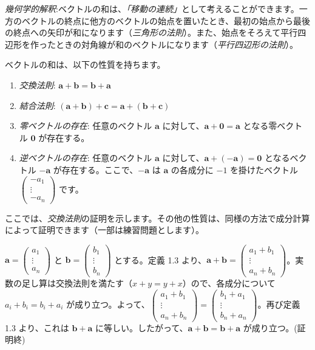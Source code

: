 \emph{幾何学的解釈}:ベクトルの和は、\emph{「移動の連続」}として考えることができます。一方のベクトルの終点に他方のベクトルの始点を置いたとき、最初の始点から最後の終点への矢印が和になります（\emph{三角形の法則}）。また、始点をそろえて平行四辺形を作ったときの対角線が和のベクトルになります（\emph{平行四辺形の法則}）。

\begin{thm}[ベクトルの和の性質]
ベクトルの和は、以下の性質を持ちます。
\begin{enumerate}
\item \emph{交換法則}: $\bm{a} + \bm{b} = \bm{b} + \bm{a}$
\item \emph{結合法則}: $(\bm{a} + \bm{b}) + \bm{c} = \bm{a} + (\bm{b} + \bm{c})$
\item \emph{零ベクトルの存在}: 任意のベクトル $\bm{a}$ に対して、$\bm{a} + \bm{0} = \bm{a}$ となる零ベクトル $\bm{0}$ が存在する。
\item \emph{逆ベクトルの存在}: 任意のベクトル $\bm{a}$ に対して、$\bm{a} + (-\bm{a}) = \bm{0}$ となるベクトル $-\bm{a}$ が存在する。ここで、$-\bm{a}$ は $\bm{a}$ の各成分に $-1$ を掛けたベクトル $\begin{pmatrix} -a_1 \\ \vdots \\ -a_n \end{pmatrix}$ です。
\end{enumerate}
\begin{proof*}
ここでは、\emph{交換法則}の証明を示します。その他の性質は、同様の方法で成分計算によって証明できます（一部は練習問題とします）。\par
$\bm{a} = \begin{pmatrix} a_1 \\ \vdots \\ a_n \end{pmatrix}$ と $\bm{b} = \begin{pmatrix} b_1 \\ \vdots \\ b_n \end{pmatrix}$ とする。定義 1.3 より、$\bm{a} + \bm{b} = \begin{pmatrix} a_1 + b_1 \\ \vdots \\ a_n + b_n \end{pmatrix}$。実数の足し算は交換法則を満たす（$x+y = y+x$）ので、各成分について $a_i + b_i = b_i + a_i$ が成り立つ。よって、$\begin{pmatrix} a_1 + b_1 \\ \vdots \\ a_n + b_n \end{pmatrix} = \begin{pmatrix} b_1 + a_1 \\ \vdots \\ b_n + a_n \end{pmatrix}$。再び定義 1.3 より、これは $\bm{b} + \bm{a}$ に等しい。したがって、$\bm{a} + \bm{b} = \bm{b} + \bm{a}$ が成り立つ。(証明終)
\end{proof*}
\end{thm}

